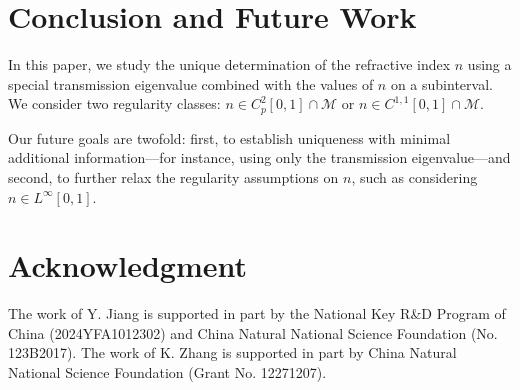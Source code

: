 \documentclass[11pt,reqno]{amsart}
\theoremstyle{definition}
\theoremstyle{remark}
\numberwithin{equation}{section}
\begin{document}

\section{Conclusion and Future Work}\label{conclusion}

In this paper, we study the unique determination of the refractive index $n$ using a special transmission eigenvalue combined with the values of $n$ on a subinterval. We consider two regularity classes: $n \in C_{p}^{2}[0,1] \cap \mathcal{M}$ or $n \in C^{1,1}[0,1] \cap \mathcal{M}$.

Our future goals are twofold: first, to establish uniqueness with minimal additional information---for instance, using only the transmission eigenvalue---and second, to further relax the regularity assumptions on $n$, such as considering $n \in L^{\infty}[0,1]$.




\section*{Acknowledgment}
The work of Y. Jiang is supported in part by the National Key R\&D Program of China (2024YFA1012302) and China Natural National Science Foundation (No. 123B2017). The work of K. Zhang is supported in part by China Natural National Science Foundation (Grant No. 12271207).
\end{document}
